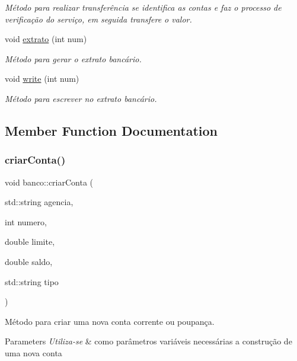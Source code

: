 \begin{DoxyCompactItemize}
\begin{DoxyCompactList}\small\item\em Método para realizar transferência se identifica as contas e faz o processo de verificação do serviço, em seguida transfere o valor. \end{DoxyCompactList}\item 
void \mbox{\hyperlink{classbanco_ab13b225a8005a75a31f2c2938b9869e1}{extrato}} (int num)
\begin{DoxyCompactList}\small\item\em Método para gerar o extrato bancário. \end{DoxyCompactList}\item 
void \mbox{\hyperlink{classbanco_ac2ca2d3e9a02bf099e3b1deb5303c2ce}{write}} (int num)
\begin{DoxyCompactList}\small\item\em Método para escrever no extrato bancário. \end{DoxyCompactList}\end{DoxyCompactItemize}


\subsection{Member Function Documentation}
\mbox{\label{classbanco_a79c3043a6d839b638167b9cb8491c5b5}} 
\subsubsection{\texorpdfstring{criar\+Conta()}{criarConta()}}
{\footnotesize\ttfamily void banco\+::criar\+Conta (\begin{DoxyParamCaption}\item[{std\+::string}]{agencia,  }\item[{int}]{numero,  }\item[{double}]{limite,  }\item[{double}]{saldo,  }\item[{std\+::string}]{tipo }\end{DoxyParamCaption})}



Método para criar uma nova conta corrente ou poupança. 


\begin{DoxyParams}{Parameters}
{\em Utiliza-\/se} & como parâmetros variáveis necessárias a construção de uma nova conta \\
\hline
\end{DoxyParams}
\mbox{\label{classbanco_a5299f885390fee021a84ffb309a0ca2f}} 
